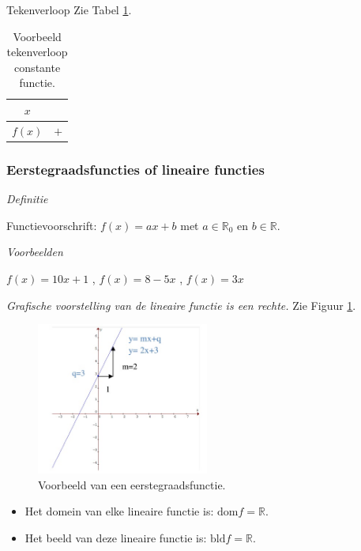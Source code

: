 Tekenverloop
Zie Tabel \ref{tab:ct_vb}.
\begin{table}[h]
\centering
\begin{tabular}{c||c}
	$x$ & \\
	\hline 
	$f(x)$ & $+$ \\
\end{tabular}
\caption{Voorbeeld tekenverloop constante functie.}
\label{tab:ct_vb}
\end{table}


\subsubsection{Eerstegraadsfuncties of lineaire functies}


\emph{Definitie}

Functievoorschrift: $f(x)=ax+b$ met $a\in\mathbb{R}_{0}$
en $b\in\mathbb{R}$.

\emph{Voorbeelden}

 $f(x)=10x+1$ , $f(x)=8-5x$ , $f(x)=3x$

\emph{Grafische voorstelling van de lineaire functie
	is een rechte.} 
Zie Figuur \ref{fig:eerstegr}.

\begin{figure}[h]
\centering{}\includegraphics[height=5cm]{2_elem_rekenvaardigheden_B/inputs/eerstegraadsfuncties1.jpg} 
\caption{Voorbeeld van een eerstegraadsfunctie.}
\label{fig:eerstegr}
\end{figure}

\begin{itemize}
	\item Het domein van elke lineaire functie is: $\textrm{dom} f = \mathbb{R}$.
	\item Het beeld van deze lineaire functie is: $\textrm{bld} f = \mathbb{R}$.
\end{itemize}

